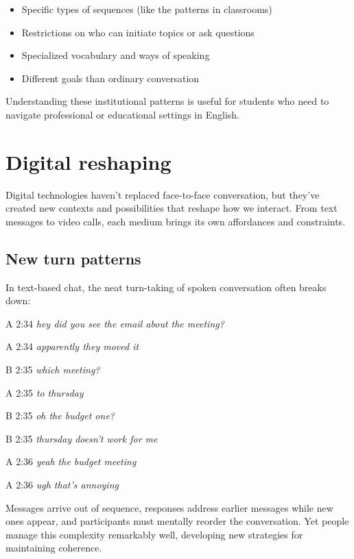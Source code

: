 \begin{itemize}[noitemsep]
\item Specific types of sequences (like the patterns in classrooms)
\item Restrictions on who can initiate topics or ask questions  
\item Specialized vocabulary and ways of speaking
\item Different goals than ordinary conversation
\end{itemize}
Understanding these institutional patterns is useful for students who need to navigate professional or educational settings in English.

\section{Digital reshaping} \label{sec:digital}

Digital technologies haven't replaced face-to-face conversation, but they've created new contexts and possibilities that reshape how we interact. From text messages to video calls, each medium brings its own affordances and constraints.

\subsection{New turn patterns} \label{subsec:new-turns}

In text-based chat, the neat turn-taking of spoken conversation often breaks down:

\ea
\begin{dialogue}
\item[A 2:34] \emph{hey did you see the email about the meeting?}
\item[A 2:34] \emph{apparently they moved it}
\item[B 2:35] \emph{which meeting?}
\item[A 2:35] \emph{to thursday}
\item[B 2:35] \emph{oh the budget one?}
\item[B 2:35] \emph{thursday doesn't work for me}
\item[A 2:36] \emph{yeah the budget meeting}
\item[A 2:36] \emph{ugh that's annoying}
\end{dialogue}
\z
Messages arrive out of sequence, responses address earlier messages while new ones appear, and participants must mentally reorder the conversation. Yet people manage this complexity remarkably well, developing new strategies for maintaining coherence.

